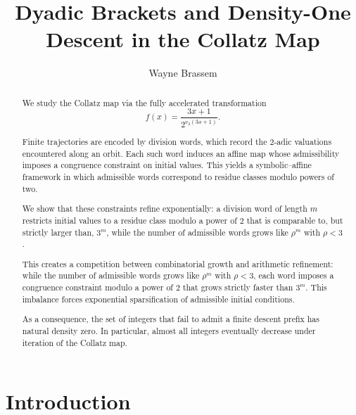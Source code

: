 \documentclass[12pt, oneside]{article}
\title{Dyadic Brackets and Density-One Descent in the Collatz Map}
\author{Wayne Brassem}
\numberwithin{equation}{section}
\theoremstyle{definition}
\theoremstyle{plain}
\theoremstyle{remark}
\begin{document}
\newcommand{\chead}[1]{\multicolumn{1}{c}{#1}}


\maketitle

\begin{abstract}

We study the Collatz map via the fully accelerated transformation
\[
f(x)=\frac{3x+1}{2^{v_2(3x+1)}}.
\]

Finite trajectories are encoded by division words, which record the
2-adic valuations encountered along an orbit. Each such word induces
an affine map whose admissibility imposes a congruence constraint on
initial values. This yields a symbolic–affine framework in which
admissible words correspond to residue classes modulo powers of two.

We show that these constraints refine exponentially: a division word
of length $m$ restricts initial values to a residue class modulo a
power of $2$ that is comparable to, but strictly larger than, $3^m$,
while the number of admissible words grows like $\rho^m$ with $\rho < 3$.

This creates a competition between combinatorial growth and arithmetic
refinement: while the number of admissible words grows like $\rho^m$
with $\rho < 3$, each word imposes a congruence constraint modulo a
power of $2$ that grows strictly faster than $3^m$. This imbalance
forces exponential sparsification of admissible initial conditions.

As a consequence, the set of integers that fail to admit a finite
descent prefix has natural density zero. In particular, almost all
integers eventually decrease under iteration of the Collatz map.

\end{abstract}

\newpage
\tableofcontents

\newpage
\section{Introduction}
\end{document}
